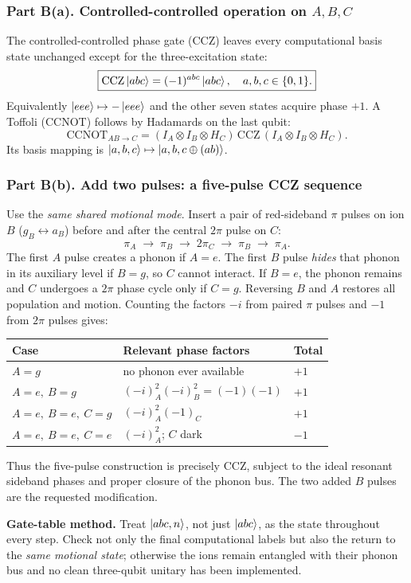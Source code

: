 \subsubsection*{Part B(a). Controlled-controlled operation on $A,B,C$}
The controlled-controlled phase gate (CCZ) leaves every computational basis state unchanged except for the three-excitation state:
\begin{equation}\boxed{\mathrm{CCZ}\left\lvert abc\right\rangle=(-1)^{abc}\left\lvert abc\right\rangle,\quad a,b,c\in\{0,1\}.}\end{equation}
Equivalently $\left\lvert eee\right\rangle\mapsto-\left\lvert eee\right\rangle$ and the other seven states acquire phase $+1$. A Toffoli (CCNOT) follows by Hadamards on the last qubit:
\begin{equation}\mathrm{CCNOT}_{AB\to C}=(I_A\otimes I_B\otimes H_C)\,\mathrm{CCZ}\,(I_A\otimes I_B\otimes H_C).\end{equation}
Its basis mapping is $\left\lvert a,b,c\right\rangle\mapsto\left\lvert a,b,c\oplus (ab)\right\rangle$.

\subsubsection*{Part B(b). Add two pulses: a five-pulse CCZ sequence}
Use the \emph{same shared motional mode}. Insert a pair of red-sideband $\pi$ pulses on ion $B$ ($g_B\leftrightarrow a_B$) before and after the central $2\pi$ pulse on $C$:
\begin{equation}\boxed{\pi_A\;\longrightarrow\;\pi_B\;\longrightarrow\;2\pi_C\;\longrightarrow\;\pi_B\;\longrightarrow\;\pi_A.}\end{equation}
The first $A$ pulse creates a phonon if $A=e$. The first $B$ pulse \emph{hides} that phonon in its auxiliary level if $B=g$, so $C$ cannot interact. If $B=e$, the phonon remains and $C$ undergoes a $2\pi$ phase cycle only if $C=g$. Reversing $B$ and $A$ restores all population and motion. Counting the factors $-i$ from paired $\pi$ pulses and $-1$ from $2\pi$ pulses gives:
\begin{center}\small
\begin{tabular}{@{}lll@{}}\toprule Case & Relevant phase factors & Total\\\midrule
$A=g$ & no phonon ever available & $+1$\\
$A=e,\ B=g$ & $(-i)^2_A(-i)^2_B=(-1)(-1)$ & $+1$\\
$A=e,\ B=e,\ C=g$ & $(-i)^2_A(-1)_C$ & $+1$\\
$A=e,\ B=e,\ C=e$ & $(-i)^2_A$; $C$ dark & $-1$\\\bottomrule
\end{tabular}\end{center}
Thus the five-pulse construction is precisely CCZ, subject to the ideal resonant sideband phases and proper closure of the phonon bus. The two added $B$ pulses are the requested modification.
\begin{examtip}\textbf{Gate-table method.} Treat $\left\lvert abc,n\right\rangle$, not just $\left\lvert abc\right\rangle$, as the state throughout every step. Check not only the final computational labels but also the return to the \emph{same motional state}; otherwise the ions remain entangled with their phonon bus and no clean three-qubit unitary has been implemented.\end{examtip}

